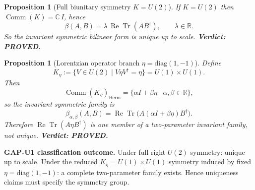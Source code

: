 \documentclass[12pt,a4paper]{article}
\newtheorem{proposition}[theorem]{Proposition}
\theoremstyle{definition}
\theoremstyle{remark}
\begin{document}
\begin{proposition}[Full biunitary symmetry $K=U(2)$]
If $K=U(2)$ then $\operatorname{Comm}(K)=\mathbb C\,I$, hence
\[
\beta(A,B)=\lambda\,\operatorname{Re}\operatorname{Tr}(AB^\dagger),\qquad \lambda\in\mathbb R.
\]
So the invariant symmetric bilinear form is unique up to scale.
\textbf{Verdict: PROVED.}
\end{proposition}

\begin{proposition}[Lorentzian operator branch $\eta=\mathrm{diag}(1,-1)$]
Define
\[
K_\eta:=\{V\in U(2)\mid V\eta V^\dagger=\eta\}=U(1)\times U(1).
\]
Then
\[
\operatorname{Comm}(K_\eta)_{\mathrm{Herm}}=\{\alpha I+\beta\eta\mid \alpha,\beta\in\mathbb R\},
\]
so the invariant symmetric family is
\[
\beta_{\alpha,\beta}(A,B)=\operatorname{Re}\operatorname{Tr}\!\big(A(\alpha I+\beta\eta)B^\dagger\big).
\]
Therefore $\operatorname{Re}\operatorname{Tr}(A\eta B^\dagger)$ is one member of a two-parameter invariant family, not unique.
\textbf{Verdict: PROVED.}
\end{proposition}

\begin{resultbox}
\textbf{GAP-U1 classification outcome.}
Under full right $U(2)$ symmetry: unique up to scale.
Under the reduced $K_\eta=U(1)\times U(1)$ symmetry induced by fixed $\eta=\mathrm{diag}(1,-1)$: a complete two-parameter family exists.
Hence uniqueness claims must specify the symmetry group.
\end{resultbox}

\ifdefined\INCLUDEMODE
\else
\end{document}
